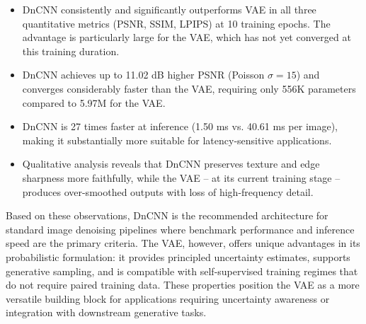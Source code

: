 \documentclass[conference]{IEEEtran}
\begin{document}
\begin{itemize}
  \item DnCNN consistently and significantly outperforms VAE in all
    three quantitative metrics (PSNR, SSIM, LPIPS) at 10 training
    epochs. The advantage is particularly large for the VAE, which has
    not yet converged at this training duration.
  \item DnCNN achieves up to 11.02 dB higher PSNR (Poisson
    \(\sigma = 15\)) and converges considerably faster than the VAE,
    requiring only 556K parameters compared to 5.97M for the VAE.
  \item DnCNN is 27 times faster at inference (1.50 ms vs. 40.61 ms
    per image), making it substantially more suitable for
    latency-sensitive applications.
  \item Qualitative analysis reveals that DnCNN preserves texture and
    edge sharpness more faithfully, while the VAE -- at its current
    training stage -- produces over-smoothed outputs with loss of
    high-frequency detail.
\end{itemize}

Based on these observations, DnCNN is the recommended architecture for
standard image denoising pipelines where benchmark performance and
inference speed are the primary criteria. The VAE, however, offers unique
advantages in its probabilistic formulation: it provides principled
uncertainty estimates, supports generative sampling, and is compatible
with self-supervised training regimes that do not require paired training
data. These properties position the VAE as a more versatile building
block for applications requiring uncertainty awareness or integration with
downstream generative tasks.



\end{document}

